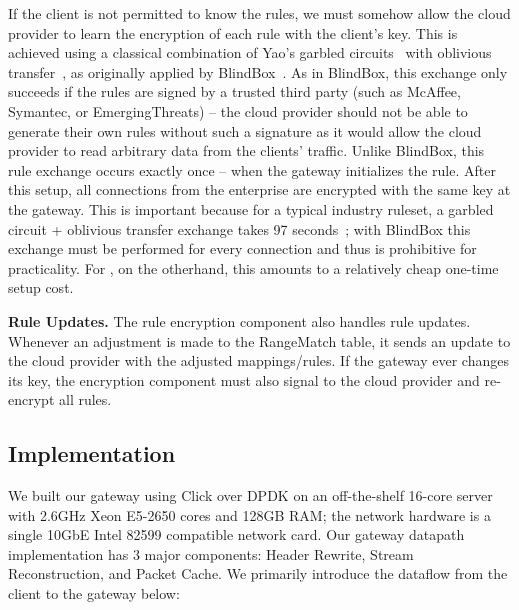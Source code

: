 If the client is not permitted to know the rules, we must somehow allow the cloud provider to learn the encryption of each rule with the client's key. This is achieved using a classical combination of Yao's garbled circuits~\cite{Yao86} with oblivious transfer~\cite{Naor-Pinkas}, as originally applied by BlindBox~\cite{blindbox}.
As in BlindBox, this exchange only succeeds if the rules are signed by a trusted third party (such as McAffee, Symantec, or EmergingThreats) -- the cloud provider should not be able to generate their own rules without such a signature as it would allow the cloud provider to read arbitrary data from the clients' traffic.
Unlike BlindBox, this rule exchange occurs exactly once -- when the gateway initializes the rule. 
After this setup, all connections from the enterprise are encrypted with the same key at the gateway.
This is important because for a typical industry ruleset, a garbled circuit + oblivious transfer exchange takes 97 seconds~\cite{blindbox}; with BlindBox this exchange must be performed for every connection and thus is prohibitive for practicality.
For \sys, on the otherhand, this amounts to a relatively cheap one-time setup cost.

\textbf{Rule Updates.}
The rule encryption component also handles rule updates. 
Whenever an adjustment is made to the RangeMatch table, it sends an update to the cloud provider with the adjusted mappings/rules.
If the gateway ever changes its key, the encryption component must also signal to the cloud provider and re-encrypt all rules.


\subsection{Implementation}
\label{sec:gwimpl}
We built our gateway using Click over DPDK on an off-the-shelf 16-core server with 2.6GHz Xeon E5-2650 cores and 128GB RAM; the network hardware is a single 10GbE Intel 82599 compatible network card. Our gateway datapath implementation has 3 major components: Header Rewrite, Stream Reconstruction, and Packet Cache. We primarily introduce the dataflow from the client to the gateway below:

